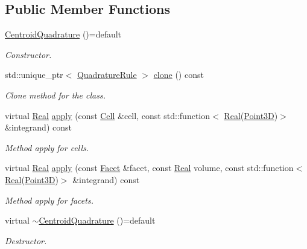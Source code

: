 \subsection*{Public Member Functions}
\begin{DoxyCompactItemize}
\item 
\hyperlink{classFVCode3D_1_1CentroidQuadrature_abfbdf9eb6e8a34e5b0623b3ca97c719b}{Centroid\+Quadrature} ()=default
\begin{DoxyCompactList}\small\item\em Constructor. \end{DoxyCompactList}\item 
std\+::unique\+\_\+ptr$<$ \hyperlink{classFVCode3D_1_1QuadratureRule}{Quadrature\+Rule} $>$ \hyperlink{classFVCode3D_1_1CentroidQuadrature_a4fb194ab9699eebcd4fcd20850d08365}{clone} () const 
\begin{DoxyCompactList}\small\item\em Clone method for the class. \end{DoxyCompactList}\item 
virtual \hyperlink{namespaceFVCode3D_a40c1f5588a248569d80aa5f867080e83}{Real} \hyperlink{classFVCode3D_1_1CentroidQuadrature_ad47227c7ea4d21c4323bc56e1c10fc18}{apply} (const \hyperlink{classFVCode3D_1_1QuadratureRule_af2f37bb8e8b8c3fd7554eaacaf4e5f3c}{Cell} \&cell, const std\+::function$<$ \hyperlink{namespaceFVCode3D_a40c1f5588a248569d80aa5f867080e83}{Real}(\hyperlink{classFVCode3D_1_1Point3D}{Point3D})$>$ \&integrand) const 
\begin{DoxyCompactList}\small\item\em Method apply for cells. \end{DoxyCompactList}\item 
virtual \hyperlink{namespaceFVCode3D_a40c1f5588a248569d80aa5f867080e83}{Real} \hyperlink{classFVCode3D_1_1CentroidQuadrature_a7dd32350ffa922a9e2a1b1b344468ab2}{apply} (const \hyperlink{classFVCode3D_1_1QuadratureRule_af6e825c3626d437e50e5da733cd0ca1b}{Facet} \&facet, const \hyperlink{namespaceFVCode3D_a40c1f5588a248569d80aa5f867080e83}{Real} volume, const std\+::function$<$ \hyperlink{namespaceFVCode3D_a40c1f5588a248569d80aa5f867080e83}{Real}(\hyperlink{classFVCode3D_1_1Point3D}{Point3D})$>$ \&integrand) const 
\begin{DoxyCompactList}\small\item\em Method apply for facets. \end{DoxyCompactList}\item 
virtual \hyperlink{classFVCode3D_1_1CentroidQuadrature_a7f4fc78002c527c8542b82de3defa8be}{$\sim$\+Centroid\+Quadrature} ()=default
\begin{DoxyCompactList}\small\item\em Destructor. \end{DoxyCompactList}\end{DoxyCompactItemize}
